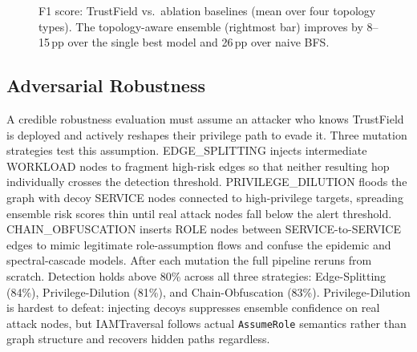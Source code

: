 \documentclass[conference,a4paper]{IEEEtran}
\begin{document}
\begin{figure}[t]
\centering
{}
\caption{F1 score: TrustField vs.\ ablation baselines (mean over four
topology types). The topology-aware ensemble (rightmost bar) improves
by 8--15\,pp over the single best model and 26\,pp over naive BFS.}
\label{fig:f1_comparison}
\end{figure}

\subsection{Adversarial Robustness}

A credible robustness evaluation must assume an attacker who knows
TrustField is deployed and actively reshapes their privilege path to
evade it. Three mutation strategies test this assumption.
EDGE\_SPLITTING injects intermediate WORKLOAD nodes to fragment
high-risk edges so that neither resulting hop individually crosses the
detection threshold.
PRIVILEGE\_DILUTION floods the graph with decoy SERVICE nodes connected
to high-privilege targets, spreading ensemble risk scores thin until real
attack nodes fall below the alert threshold.
CHAIN\_OBFUSCATION inserts ROLE nodes between SERVICE-to-SERVICE edges to
mimic legitimate role-assumption flows and confuse the epidemic and
spectral-cascade models.
After each mutation the full pipeline reruns from scratch.
Detection holds above 80\% across all three strategies:
Edge-Splitting (84\%), Privilege-Dilution (81\%), and Chain-Obfuscation (83\%).
Privilege-Dilution is hardest to defeat: injecting decoys suppresses ensemble
confidence on real attack nodes, but IAMTraversal follows actual
\texttt{AssumeRole} semantics rather than graph structure and recovers
hidden paths regardless.
\end{document}
